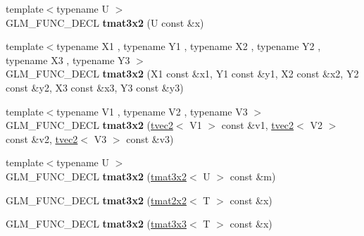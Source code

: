 \begin{DoxyCompactItemize}
\item 
\hypertarget{structglm_1_1detail_1_1tmat3x2_a3dfc353701bc710b38ad9d1d2a3b3c33}{}{\footnotesize template$<$typename U $>$ }\\G\+L\+M\+\_\+\+F\+U\+N\+C\+\_\+\+D\+E\+C\+L {\bfseries tmat3x2} (U const \&x)\label{structglm_1_1detail_1_1tmat3x2_a3dfc353701bc710b38ad9d1d2a3b3c33}

\item 
\hypertarget{structglm_1_1detail_1_1tmat3x2_a79b47962349e29fa8ecb2b001210818a}{}{\footnotesize template$<$typename X1 , typename Y1 , typename X2 , typename Y2 , typename X3 , typename Y3 $>$ }\\G\+L\+M\+\_\+\+F\+U\+N\+C\+\_\+\+D\+E\+C\+L {\bfseries tmat3x2} (X1 const \&x1, Y1 const \&y1, X2 const \&x2, Y2 const \&y2, X3 const \&x3, Y3 const \&y3)\label{structglm_1_1detail_1_1tmat3x2_a79b47962349e29fa8ecb2b001210818a}

\item 
\hypertarget{structglm_1_1detail_1_1tmat3x2_aef9cee068c06d4f17b179a0ed547e9bd}{}{\footnotesize template$<$typename V1 , typename V2 , typename V3 $>$ }\\G\+L\+M\+\_\+\+F\+U\+N\+C\+\_\+\+D\+E\+C\+L {\bfseries tmat3x2} (\hyperlink{structglm_1_1detail_1_1tvec2}{tvec2}$<$ V1 $>$ const \&v1, \hyperlink{structglm_1_1detail_1_1tvec2}{tvec2}$<$ V2 $>$ const \&v2, \hyperlink{structglm_1_1detail_1_1tvec2}{tvec2}$<$ V3 $>$ const \&v3)\label{structglm_1_1detail_1_1tmat3x2_aef9cee068c06d4f17b179a0ed547e9bd}

\item 
\hypertarget{structglm_1_1detail_1_1tmat3x2_a96ddf6c4f4c4c04e26cfdaabd98c3b83}{}{\footnotesize template$<$typename U $>$ }\\G\+L\+M\+\_\+\+F\+U\+N\+C\+\_\+\+D\+E\+C\+L {\bfseries tmat3x2} (\hyperlink{structglm_1_1detail_1_1tmat3x2}{tmat3x2}$<$ U $>$ const \&m)\label{structglm_1_1detail_1_1tmat3x2_a96ddf6c4f4c4c04e26cfdaabd98c3b83}

\item 
\hypertarget{structglm_1_1detail_1_1tmat3x2_a6a485c50629df672e139304600acfa98}{}G\+L\+M\+\_\+\+F\+U\+N\+C\+\_\+\+D\+E\+C\+L {\bfseries tmat3x2} (\hyperlink{structglm_1_1detail_1_1tmat2x2}{tmat2x2}$<$ T $>$ const \&x)\label{structglm_1_1detail_1_1tmat3x2_a6a485c50629df672e139304600acfa98}

\item 
\hypertarget{structglm_1_1detail_1_1tmat3x2_aa11eb83ebd8b806596808d8fa628022c}{}G\+L\+M\+\_\+\+F\+U\+N\+C\+\_\+\+D\+E\+C\+L {\bfseries tmat3x2} (\hyperlink{structglm_1_1detail_1_1tmat3x3}{tmat3x3}$<$ T $>$ const \&x)\label{structglm_1_1detail_1_1tmat3x2_aa11eb83ebd8b806596808d8fa628022c}


\end{DoxyCompactItemize}
